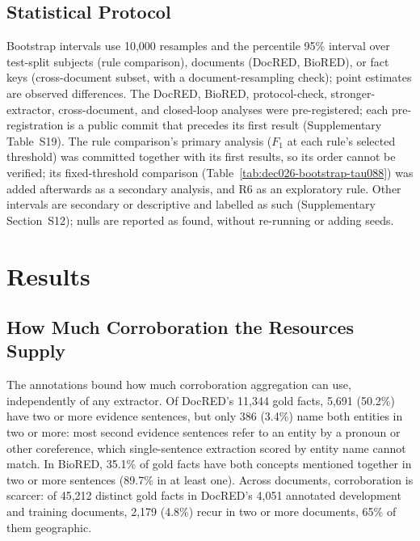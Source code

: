 \documentclass[preprint,12pt,authoryear]{elsarticle}
\begin{document}
\subsection{Statistical Protocol}
\label{sec:setup-statistics}

Bootstrap intervals use 10,000 resamples and the percentile 95\%
interval over test-split subjects (rule comparison), documents (DocRED,
BioRED), or fact keys (cross-document subset, with a document-resampling
check); point estimates are observed differences. The DocRED, BioRED,
protocol-check, stronger-extractor, cross-document, and closed-loop
analyses were pre-registered; each pre-registration is a public commit
that precedes its first result (Supplementary Table~S19). The rule
comparison's primary analysis ($F_1$ at each rule's selected threshold)
was committed together with its first results, so its order cannot be
verified; its fixed-threshold comparison
(Table~\ref{tab:dec026-bootstrap-tau088}) was added afterwards as a
secondary analysis, and R6 as an exploratory rule. Other intervals are
secondary or descriptive and labelled as such (Supplementary
Section~S12); nulls are reported as found, without re-running or adding
seeds.

\section{Results}
\label{sec:results}

\subsection{How Much Corroboration the Resources Supply}
\label{sec:results-availability}

The annotations bound how much corroboration aggregation can use,
independently of any extractor. Of DocRED's 11,344 gold facts, 5,691
(50.2\%) have two or more evidence sentences, but only 386 (3.4\%) name
both entities in two or more: most second evidence sentences refer to an
entity by a pronoun or other coreference, which single-sentence
extraction scored by entity name cannot match. In BioRED, 35.1\% of gold
facts have both concepts mentioned together in two or more sentences
(89.7\% in at least one). Across documents, corroboration is scarcer: of
45,212 distinct gold facts in DocRED's 4,051 annotated development and
training documents, 2,179 (4.8\%) recur in two or more documents, 65\% of
them geographic.
\end{document}
